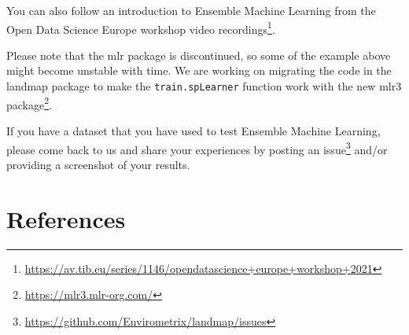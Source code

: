 \documentclass[
  graybox,natbib,nospthms]{svmono}
\renewcommand{\href}[2]{#2 (\url{#1})}
\renewcommand{\href}[2]{#2\footnote{\url{#1}}}
\begin{document}
You can also follow an introduction to Ensemble Machine Learning from the \href{https://av.tib.eu/series/1146/opendatascience+europe+workshop+2021}{Open Data Science Europe workshop video recordings}.

Please note that the mlr package is discontinued, so some of the example above might become unstable with time. We are working on migrating the code in the landmap package to make the \texttt{train.spLearner} function work with the new \href{https://mlr3.mlr-org.com/}{mlr3 package}.

If you have a dataset that you have used to test Ensemble Machine Learning, please come back to us and share your experiences by posting \href{https://github.com/Envirometrix/landmap/issues}{an issue} and/or providing a screenshot of your results.

\hypertarget{references}{%
\chapter{References}\label{references}}

  

\backmatter
\printindex
\end{document}
